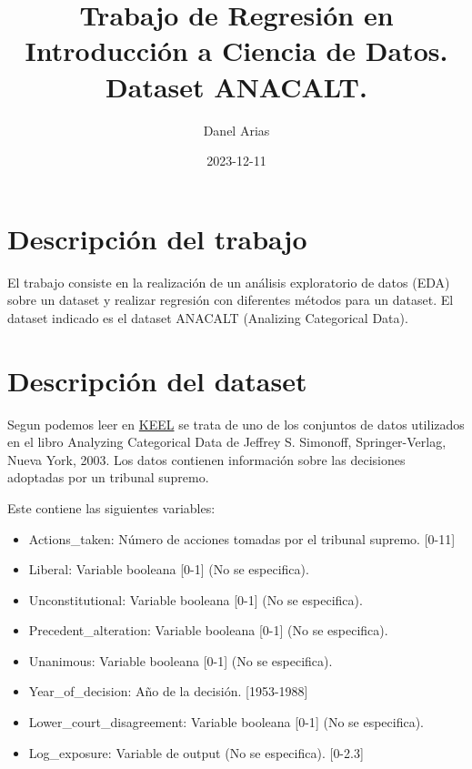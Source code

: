 \documentclass[
]{article}
\title{Trabajo de Regresión en Introducción a Ciencia de Datos. Dataset
ANACALT.}
\author{Danel Arias}
\date{2023-12-11}
\providecommand{\tightlist}{%
  \setlength{\itemsep}{0pt}\setlength{\parskip}{0pt}}
\begin{document}
\maketitle

\hypertarget{descripciuxf3n-del-trabajo}{%
\section{Descripción del trabajo}\label{descripciuxf3n-del-trabajo}}

El trabajo consiste en la realización de un análisis exploratorio de
datos (EDA) sobre un dataset y realizar regresión con diferentes métodos
para un dataset. El dataset indicado es el dataset ANACALT (Analizing
Categorical Data).

\hypertarget{descripciuxf3n-del-dataset}{%
\section{Descripción del dataset}\label{descripciuxf3n-del-dataset}}

Segun podemos leer en
\href{https://sci2s.ugr.es/keel/dataset.php?cod=159}{KEEL} se trata de
uno de los conjuntos de datos utilizados en el libro Analyzing
Categorical Data de Jeffrey S. Simonoff, Springer-Verlag, Nueva York,
2003. Los datos contienen información sobre las decisiones adoptadas por
un tribunal supremo.

Este contiene las siguientes variables:

\begin{itemize}
\tightlist
\item
  Actions\_taken: Número de acciones tomadas por el tribunal supremo.
  {[}0-11{]}
\item
  Liberal: Variable booleana {[}0-1{]} (No se especifica).
\item
  Unconstitutional: Variable booleana {[}0-1{]} (No se especifica).
\item
  Precedent\_alteration: Variable booleana {[}0-1{]} (No se especifica).
\item
  Unanimous: Variable booleana {[}0-1{]} (No se especifica).
\item
  Year\_of\_decision: Año de la decisión. {[}1953-1988{]}
\item
  Lower\_court\_disagreement: Variable booleana {[}0-1{]} (No se
  especifica).
\item
  Log\_exposure: Variable de output (No se especifica). {[}0-2.3{]}
\end{itemize}
\end{document}
